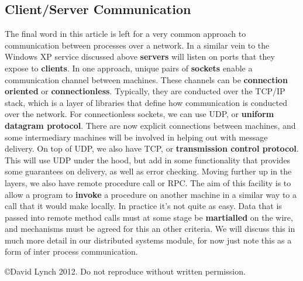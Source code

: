 \documentclass[10pt,a4paper]{article}
\begin{document}
\subsection{Client/Server Communication}
The final word in this article is left for a very common approach to communication between processes over a network. In a similar vein to the Windows XP service discussed above {\bf servers} will listen on ports that they expose to {\bf clients}. In one approach, unique pairs of {\bf sockets} enable a communication channel between machines. These channels can be {\bf connection oriented} or {\bf connectionless}. Typically, they are conducted over the TCP/IP stack, which is a layer of libraries that define how communication is conducted over the network. For connectionless sockets, we can use UDP, or {\bf uniform datagram protocol}. There are now explicit connections between machines, and some intermediary machines will be involved in helping out with message delivery. On top of UDP, we also have TCP, or {\bf transmission control protocol}. This will use UDP under the hood, but add in some functionality that provides some guarantees on delivery, as well as error checking.
\newline\newline
Moving further up in the layers, we also have {remote procedure call} or RPC. The aim of this facility is to allow a program to {\bf invoke} a procedure on another machine in a similar way to a call that it would make locally. In practice it's not quite as easy. Data that is passed into remote method calls must at some stage be {\bf martialled} on the wire, and mechanisms must be agreed for this an other criteria. 
\newline\newline
We will discuss this in much more detail in our distributed systems module, for now just note this as a form of inter process communication. 
{}

\begin{center}
{\small \copyright  David Lynch 2012. Do not reproduce without written permission.}
\end{center}
\end{document}
